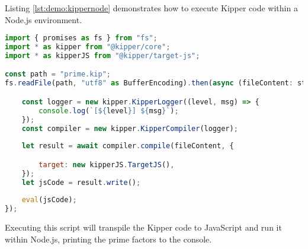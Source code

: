 Listing \ref{lst:demo:kippernode} demonstrates how to execute Kipper code within a Node.js environment.

\begin{lstlisting}[language=JavaScript,caption=Executing Kipper code in Node.js, label=lst:demo:kippernode]
import { promises as fs } from "fs";
import * as kipper from "@kipper/core";
import * as kipperJS from "@kipper/target-js";

const path = "prime.kip";
fs.readFile(path, "utf8" as BufferEncoding).then(async (fileContent: string) => {

	const logger = new kipper.KipperLogger((level, msg) => {
		console.log(`[${level}] ${msg}`);
	});
	const compiler = new kipper.KipperCompiler(logger);
	
	let result = await compiler.compile(fileContent, {

		target: new kipperJS.TargetJS(),
	});
	let jsCode = result.write();
	
	eval(jsCode);
});
\end{lstlisting}

Executing this script will transpile the Kipper code to JavaScript and run it within Node.js, printing the prime factors to the console.

